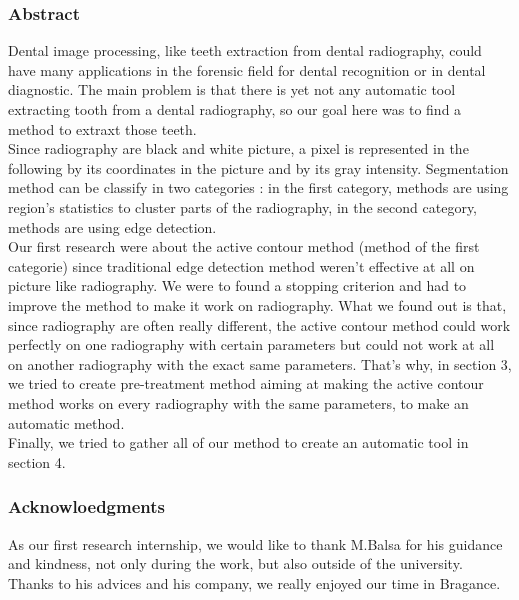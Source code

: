 \subsubsection*{Abstract}
Dental image processing, like teeth extraction from dental radiography, could have many applications in the forensic field for dental recognition or in dental diagnostic. The main problem is that there is yet not any automatic tool extracting tooth from a dental radiography, so our goal here was to find a method to extraxt those teeth.\\
Since radiography are black and white picture, a pixel is represented in the following by its coordinates in the picture and by its gray intensity. Segmentation method can be classify in two categories : in the first category, methods are using region's statistics to cluster parts of the radiography, in the second category, methods are using edge detection.\\  
Our first research were about the active contour method (method of the first categorie) since traditional edge detection method weren't effective at all on picture like radiography. We were to found a stopping criterion and had to improve the method to make it work on radiography. What we found out is that, since radiography are often really different, the active contour method could work perfectly on one radiography with certain parameters but could not work at all on another radiography with the exact same parameters. That's why, in section 3, we tried to create pre-treatment method aiming at making the active contour method works on every radiography with the same parameters, to make an automatic method.\\
Finally, we tried to gather all of our method to create an automatic tool in section 4. 
\subsubsection*{Acknowloedgments}
As our first research internship, we would like to thank M.Balsa for his guidance and kindness, not only during the work, but also outside of the university. Thanks to his advices and his company, we really enjoyed our time in Bragance.   